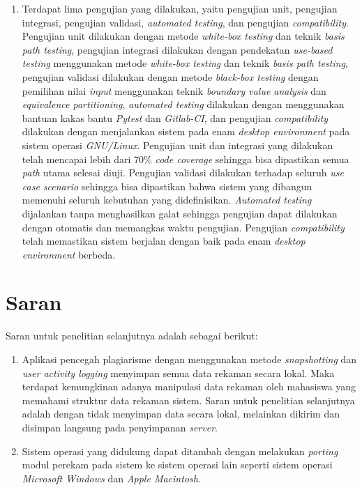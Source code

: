 \begin{enumerate}
\item Terdapat lima pengujian yang dilakukan, yaitu pengujian unit,
  pengujian integrasi, pengujian validasi, \emph{automated testing}, dan pengujian
  \emph{compatibility}. Pengujian unit
  dilakukan dengan metode \emph{white-box testing} dan teknik
  \emph{basis path testing}, pengujian integrasi dilakukan dengan
  pendekatan \emph{use-based testing} menggunakan metode
  \emph{white-box testing} dan teknik \emph{basis path testing},
  pengujian validasi dilakukan dengan metode \emph{black-box testing}
  dengan pemilihan nilai \emph{input} menggunakan teknik \emph{boundary
    value analysis} dan \emph{equivalence partitioning}, \emph{automated
    testing} dilakukan dengan menggunakan bantuan kakas bantu \emph{Pytest} dan
  \emph{Gitlab-CI}, dan pengujian
  \emph{compatibility} dilakukan dengan menjalankan sistem pada enam
  \emph{desktop environment} pada sistem operasi \emph{GNU/Linux}.
  Pengujian unit dan
  integrasi yang dilakukan telah mencapai lebih dari 70\%
  \emph{code coverage} sehingga bisa dipastikan semua \emph{path}
  utama selesai diuji. Pengujian validasi dilakukan terhadap seluruh
  \emph{use case scenario} sehingga bisa dipastikan bahwa sistem yang
  dibangun memenuhi seluruh kebutuhan yang didefinisikan. \emph{Automated
    testing} dijalankan tanpa menghasilkan galat sehingga pengujian
  dapat dilakukan dengan otomatis dan memangkas waktu pengujian. Pengujian
  \emph{compatibility} telah memastikan sistem berjalan dengan baik
  pada enam \emph{desktop environment} berbeda.
\end{enumerate}

\section{Saran}

Saran untuk penelitian selanjutnya adalah sebagai berikut:

\begin{enumerate}
\item Aplikasi pencegah plagiarisme dengan menggunakan metode
  \emph{snapshotting} dan \emph{user activity logging} menyimpan semua
  data rekaman secara lokal. Maka terdapat kemungkinan adanya
  manipulasi data rekaman oleh mahasiswa yang memahami struktur data
  rekaman sistem. Saran untuk penelitian selanjutnya adalah dengan
  tidak menyimpan data secara lokal, melainkan dikirim dan disimpan
  langsung pada penyimpanan \emph{server}.

\item Sistem operasi yang didukung dapat ditambah dengan melakukan
  \emph{porting} modul perekam pada sistem ke sistem operasi lain
  seperti sistem operasi \emph{Microsoft Windows} dan \emph{Apple
    Macintosh}.
\end{enumerate}


